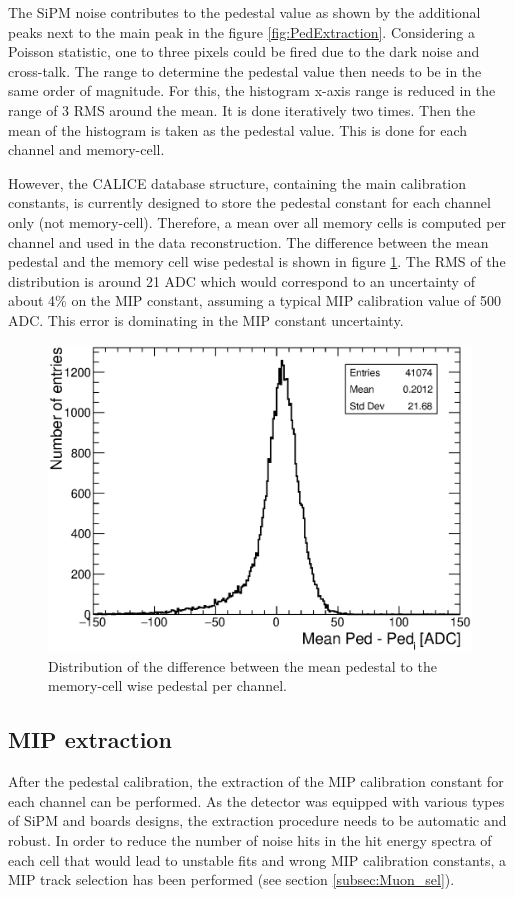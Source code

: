 The SiPM noise contributes to the pedestal value as shown by the additional peaks next to the main peak in the figure \ref{fig:PedExtraction}. Considering a Poisson statistic, one to three pixels could be fired due to the dark noise and cross-talk. The range to determine the pedestal value then needs to be in the same order of magnitude. For this, the histogram x-axis range is reduced in the range of 3 RMS around the mean. It is done iteratively two times. Then the mean of the histogram is taken as the pedestal value. This is done for each channel and memory-cell.

However, the CALICE database structure, containing the main calibration constants, is currently designed to store the pedestal constant for each channel only (not memory-cell). Therefore, a mean over all memory cells is computed per channel and used in the data reconstruction. The difference between the mean pedestal and the memory cell wise pedestal is shown in figure \ref{fig:CompMeanMem}. The RMS of the distribution is around 21 ADC which would correspond to an uncertainty of about 4\% on the MIP constant, assuming a typical MIP calibration value of 500 ADC. This error is dominating in the MIP constant uncertainty.

\begin{figure}[htbp!]
	\centering
	\includegraphics[width=0.6\linewidth]{../Thesis_Plots/EnergyCalib/Plots/ComparisonMeanPedtoMemorycell.eps}
	\caption{Distribution of the difference between the mean pedestal to the memory-cell wise pedestal per channel.} \label{fig:CompMeanMem}
\end{figure}

\subsection{MIP extraction}
\label{sec:MIPExtraction}

After the pedestal calibration, the extraction of the MIP calibration constant for each channel can be performed. As the detector was equipped with various types of SiPM and boards designs, the extraction procedure needs to be automatic and robust. In order to reduce the number of noise hits in the hit energy spectra of each cell that would lead to unstable fits and wrong MIP calibration constants, a MIP track selection has been performed (see section \ref{subsec:Muon_sel}).

